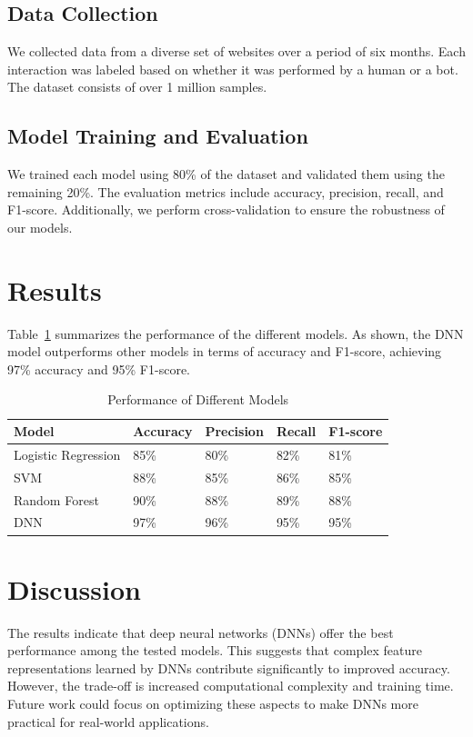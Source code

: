 \documentclass{article}
\begin{document}
\subsection{Data Collection}
\label{subsec:data_collection}
We collected data from a diverse set of websites over a period of six months. Each interaction was labeled based on whether it was performed by a human or a bot. The dataset consists of over 1 million samples.

\subsection{Model Training and Evaluation}
\label{subsec:model_training}
We trained each model using 80\% of the dataset and validated them using the remaining 20\%. The evaluation metrics include accuracy, precision, recall, and F1-score. Additionally, we perform cross-validation to ensure the robustness of our models.

\section{Results}
\label{sec:results}
Table~\ref{tab:results} summarizes the performance of the different models. As shown, the DNN model outperforms other models in terms of accuracy and F1-score, achieving 97\% accuracy and 95\% F1-score.

\begin{table}[ht]
\centering
\caption{Performance of Different Models}
\label{tab:results}
\begin{tabular}{@{}lllll@{}}
\toprule
Model & Accuracy & Precision & Recall & F1-score \\ \midrule
Logistic Regression & 85\% & 80\% & 82\% & 81\% \\
SVM & 88\% & 85\% & 86\% & 85\% \\
Random Forest & 90\% & 88\% & 89\% & 88\% \\
DNN & 97\% & 96\% & 95\% & 95\% \\ \bottomrule
\end{tabular}
\end{table}

\section{Discussion}
\label{sec:discussion}
The results indicate that deep neural networks (DNNs) offer the best performance among the tested models. This suggests that complex feature representations learned by DNNs contribute significantly to improved accuracy. However, the trade-off is increased computational complexity and training time. Future work could focus on optimizing these aspects to make DNNs more practical for real-world applications.
\end{document}
